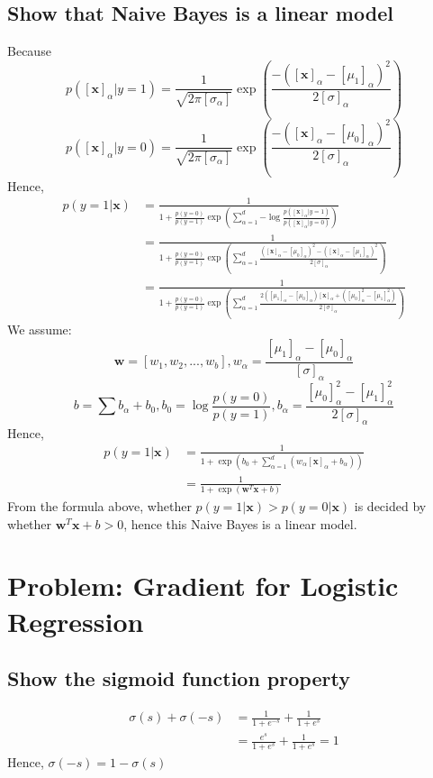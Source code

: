 \documentclass{article}
\begin{document}
	\subsection{Show that Naive Bayes is a linear model}
	Because
	\[
		p([\textbf{x}]_{\alpha}|y=1)=
		\frac{1}{\sqrt{2\pi[\sigma_{\alpha}]}}
		\exp\left({
			\frac{
			-([\textbf{x}]_{\alpha}-[\mu_1]_{\alpha})^2
			}{
				2[\sigma]_{\alpha}
			}
		}\right)
	\]
	\[
		p([\textbf{x}]_{\alpha}|y=0)=
		\frac{1}{\sqrt{2\pi[\sigma_{\alpha}]}}
		\exp\left({
			\frac{
			-([\textbf{x}]_{\alpha}-[\mu_0]_{\alpha})^2
			}{
				2[\sigma]_{\alpha}
			}
		}\right)
	\]
	Hence,
	\[
		\begin{split}
			p(y=1|\textbf{x})&=\frac{1}{1+\frac{p(y=0)}{p(y=1)}\exp{\left(\sum_{\alpha=1}^d{-\log{\frac{p([\textbf{x}]_\alpha|y=1)}{p([\textbf{x}]_\alpha|y=0)}}}\right)}}\\
			&=\frac{1}{1+\frac{p(y=0)}{p(y=1)}\exp{\left(\sum_{\alpha=1}^d{\frac{([\textbf{x}]_{\alpha}-[\mu_0]_{\alpha})^2-([\textbf{x}]_{\alpha}-[\mu_1]_{\alpha})^2}{2[\sigma]_{\alpha}}}\right)}}\\
			&=\frac{1}{1+\frac{p(y=0)}{p(y=1)}\exp{\left(\sum_{\alpha=1}^d{\frac{2([\mu_1]_{\alpha}- [\mu_0]_{\alpha})[\textbf{x}]_{\alpha}+([\mu_0]_{\alpha}^2-[\mu_1]_{\alpha}^2)}{2[\sigma]_{\alpha}}}\right)}}
		\end{split}
	\]
	We assume:
	\[\textbf{w}=[w_1, w_2,...,w_b], w_\alpha=\frac{[\mu_1]_{\alpha}- [\mu_0]_{\alpha}}{[\sigma]_{\alpha}}\]
	\[b=\sum{b_\alpha}+b_0, b_0=\log{\frac{p(y=0)}{p(y=1)}}, b_\alpha=\frac{[\mu_0]_{\alpha}^2-[\mu_1]_{\alpha}^2}{2[\sigma]_{\alpha}}\]
	Hence,
	\[\begin{split}
		p(y=1|\textbf{x})&=\frac{1}{1+\exp{\left(b_0+\sum_{\alpha=1}^d {(w_\alpha[\textbf{x}]_\alpha+b_\alpha)}\right)}}\\
		&=\frac{1}{1+\exp{\left(\textbf{w}^T\textbf{x}+b\right)}}
	\end{split}\]
	From the formula above, whether $p(y=1|\textbf{x}) > p(y=0|\textbf{x})$ is decided by whether $\textbf{w}^T\textbf{x}+b>0$, hence this Naive Bayes is a linear model.
	
	\section{Problem: Gradient for Logistic Regression}
	\subsection{Show the sigmoid function property}
	\[\begin{split}
		\sigma(s)+\sigma(-s)&=\frac{1}{1+e^{-s}}+\frac{1}{1+e^{s}}\\
		&=\frac{e^s}{1+e^{s}}+\frac{1}{1+e^{s}}=1
	\end{split}\]
	Hence, $\sigma(-s)=1-\sigma(s)$
	
\end{document}
